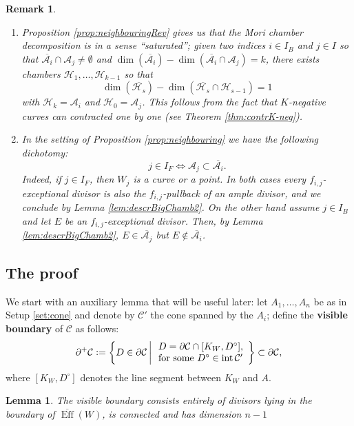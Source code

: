 \documentclass[a4paper,11pt]{amsart}
\newtheorem{lemma}[theorem]{Lemma}
\newtheorem{remark}[theorem]{Remark}
\def\dim{\operatorname{dim}}
\def\Eff{\operatorname{Eff}}
\def\inter{\operatorname{int}}
\newcommand{\Hh}{\mathcal{H}}
\newcommand{\Cc}{\mathcal{C}}
\newcommand{\Aa}{\mathcal{A}}
\newcommand{\defeq}{\vcentcolon=}
\begin{document}
\begin{remark}\leavevmode\label{rem:saturation}
	\begin{enumerate}
		\item Proposition \ref{prop:neighbouringRev} gives us that the Mori chamber decomposition is in a sense \emph{``saturated''}; 
		given two indices $i\in I_B$ and $j\in I$ so that $\overline{\Aa_i} \cap \Aa_j \neq \emptyset$ and $\dim\left(\overline{\Aa_i}\right) - \dim\left( \overline{\Aa_i} \cap \Aa_j \right) = k$, there exists chambers $\Hh_1,\dots,\Hh_{k-1}$ so that
		\[
		\dim\left(\overline{\Hh_s}\right) - \dim\left( \overline{\Hh_s} \cap \Hh_{s-1} \right) = 1
		\]
		with $\Hh_k = \Aa_i$ and $\Hh_0 = \Aa_j$.
		This follows from the fact that $K$-negative curves can contracted one by one (see Theorem \ref{thm:contrK-neg}).
		\item In the setting of Proposition \ref{prop:neighbouring} we have the following dichotomy:
		\[
		j \in I_F \iff \Aa_j \subset \overline{\Aa_i}.
		\]
		Indeed, if $j \in I_F$, then $W_j$ is a curve or a point.
		In both cases every $f_{i,j}$-exceptional divisor is also the $f_{i,j}$-pullback of an ample divisor, and we conclude by Lemma \ref{lem:descrBigChamb2}.
		On the other hand assume $j \in I_B$ and let $E$ be an $f_{i,j}$-exceptional divisor.
		Then, by Lemma \ref{lem:descrBigChamb2}, $E \in \overline{\Aa_j}$ but $E \not\in \overline{\Aa_i}$.
	\end{enumerate}
\end{remark}

\subsection{The proof}\label{subsec:proof}

We start with an auxiliary lemma that will be useful later:
let $A_1, \dots, A_n$ be as in Setup \ref{set:cone} and denote by $\Cc'$ the cone spanned by the $A_i$;
define the \textbf{visible boundary} of $\Cc$ as follows:
\[
\partial^+\Cc \defeq \left\{D \in \partial\Cc \,\middle|\, 
\begin{array}{c}
	D = \partial\Cc \cap [K_W,D^{\circ}],\\
	\text{for some } D^{\circ} \in \inter\Cc'
\end{array}
\right\} \subset \partial\Cc,
\]
where $[K_W,D^{\circ}]$ denotes the line segment between $K_W$ and $A$.

\begin{lemma}
	The visible boundary consists entirely of divisors lying in the boundary of $\overline{\Eff}(W)$, is connected and has dimension $n-1$
\end{lemma}
\end{document}

